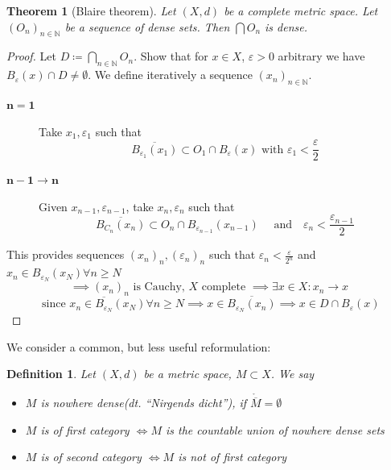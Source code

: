 \documentclass{article}
\newcounter{lecref}[section]
\numberwithin{lecref}{section}
\newtheorem{theorem}[lecref]{Theorem}
\newtheorem{definition}[lecref]{Definition}
\newcommand{\dt}[1]{(dt. \enquote{\foreignlanguage{german}{#1}})}
\begin{document}
\begin{theorem}[Blaire theorem]
	\label{theorem:1.23}
	Let $(X, d)$ be a complete metric space.
	Let $\left(O_n\right)_{n \in \mathbb N}$ be a sequence of dense sets.
	Then $\bigcap O_n$ is dense.
\end{theorem}
\begin{proof}
	Let $D \coloneqq \bigcap_{n \in \mathbb N} O_n$. Show that for $x \in X$, $\varepsilon > 0$ arbitrary we have $B_{\varepsilon}(x) \cap D \neq \emptyset$.
	We define iteratively a sequence $(x_n)_{n \in \mathbb N}$.

	\begin{description}
		\item[$\mathbf{n = 1}$] Take $x_1, \varepsilon_1$ such that
			\[ \overline{B_{\varepsilon_1}(x_1)} \subset O_1 \cap B_{\varepsilon}(x) \text{ with } \varepsilon_1 < \frac\varepsilon2 \]
		\item[$\mathbf{n-1\to n}$] Given $x_{n-1}, \varepsilon_{n-1}$, take $x_n, \varepsilon_n$ such that
			\[ \overline{B_{C_n}(x_n)} \subset O_n \cap B_{\varepsilon_{n-1}}(x_{n-1}) \quad \text{ and} \quad \varepsilon_n < \frac{\varepsilon_{n-1}}{2} \]
	\end{description}

	This provides sequences $(x_n)_n, (\varepsilon_n)_n$ such that $\varepsilon_n < \frac\varepsilon{2^n}$ and $x_n \in B_{\varepsilon_N}(x_N) \forall n \geq N$
	\[ \implies (x_n)_n \text{ is Cauchy, } X \text{ complete } \implies \exists x \in X: x_n \to x \]
	\[ \text{ since } x_n \in \overline{B_{\varepsilon_N}}(x_N) \forall n \geq N \implies x \in \overline{B_{\varepsilon_N}(x_n)} \implies x \in D \cap B_{\varepsilon}(x) \]
\end{proof}

We consider a common, but less useful reformulation:

\begin{definition}
	\label{defintion:1.24}
	Let $(X, d)$ be a metric space, $M \subset X$. We say
	\begin{itemize}
		\item $M$ is \emph{nowhere dense}\dt{Nirgends dicht}, if $\mathring{\overline M} = \emptyset$
		\item $M$ is of \emph{first category} $\iff M$ is the countable union of nowhere dense sets
		\item $M$ is of \emph{second category} $\iff M$ is not of first category
	\end{itemize}
\end{definition}
\end{document}
